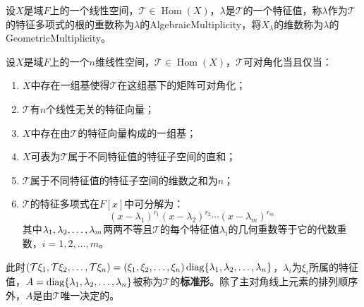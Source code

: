 \begin{definition}
	设$X$是域$F$上的一个线性空间，$\mathcal{T}\in\operatorname{Hom}(X)$，$\lambda$是$\mathcal{T}$的一个特征值，称$\lambda$作为$\mathcal{T}$的特征多项式的根的重数称为$\lambda$的\gls{AlgebraicMultiplicity}，将$X_{\lambda}$的维数称为$\lambda$的\gls{GeometricMultiplicity}。
\end{definition}
\begin{theorem}\label{theo:LinearTransformationDiagonal}
	设$X$是域$F$上的一个$n$维线性空间，$\mathcal{T}\in\operatorname{Hom}(X)$，$\mathcal{T}$可对角化当且仅当：
	\begin{enumerate}
		\item $X$中存在一组基使得$\mathcal{T}$在这组基下的矩阵可对角化；
		\item $\mathcal{T}$有$n$个线性无关的特征向量；
		\item $X$中存在由$\mathcal{T}$的特征向量构成的一组基；
		\item $X$可表为$\mathcal{T}$属于不同特征值的特征子空间的直和；
		\item $\mathcal{T}$属于不同特征值的特征子空间的维数之和为$n$；
		\item $\mathcal{T}$的特征多项式在$F[x]$中可分解为：
		\begin{equation*}
			(x-\lambda_1)^{r_1}(x-\lambda_2)^{r_2}\cdots(x-\lambda_m)^{r_m}
		\end{equation*}
		其中$\lambda_1, \lambda_2, \dots, \lambda_{m}$两两不等且$\mathcal{T}$的每个特征值$\lambda_i$的几何重数等于它的代数重数，$i=1,2,\dots,m$。
	\end{enumerate}
	此时$(\mathcal{T}\xi_1, \mathcal{T}\xi_2, \dots, \mathcal{T}\xi_{n})=(\xi_1, \xi_2, \dots, \xi_{n})\operatorname{diag}\{\lambda_1, \lambda_2, \dots, \lambda_{n}\}$，$\lambda_i$为$\xi_i$所属的特征值，$A=\operatorname{diag}\{\lambda_1, \lambda_2, \dots, \lambda_{n}\}$被称为$\mathcal{T}$的\textbf{标准形}。除了主对角线上元素的排列顺序外，$A$是由$\mathcal{T}$唯一决定的。
\end{theorem}
